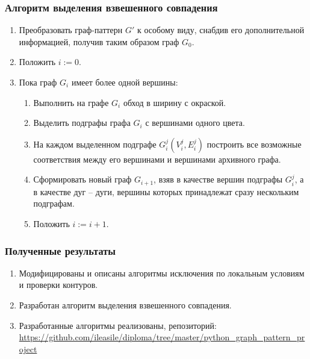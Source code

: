\documentclass{beamer}
\begin{document}
\begin{frame}
\frametitle{Алгоритм выделения взвешенного совпадения}
\begin{enumerate}
	\item Преобразовать граф-паттерн $G'$ к особому виду, снабдив его дополнительной информацией, получив таким образом граф $G_0$.
	\item Положить $i := 0$.
	\item Пока граф $G_i$ имеет более одной вершины:
	\begin{enumerate}
		\item Выполнить на графе $G_i$ обход в ширину с окраской.
		\item Выделить подграфы графа $G_i$ с вершинами одного цвета.
		\item На каждом выделенном подграфе $G_i^j(V_i^j, E_i^j)$ построить все возможные соответствия между его вершинами и вершинами архивного графа.
		\item Сформировать новый граф $G_{i+1}$, взяв в качестве вершин подграфы $G_i^j$, а в качестве дуг -- дуги, вершины которых принадлежат сразу нескольким подграфам.
		\item Положить $i := i + 1$.
	\end{enumerate}
\end{enumerate}
\end{frame}

\begin{frame}
\frametitle{Полученные результаты}
\begin{enumerate}
	\item Модифицированы и описаны алгоритмы исключения по локальным условиям и проверки контуров.
	\item Разработан алгоритм выделения взвешенного совпадения.
	\item Разработанные алгоритмы реализованы, репозиторий: \url{https://github.com/ileasile/diploma/tree/master/python_graph_pattern_project}
\end{enumerate}
\end{frame}
 
\end{document}
